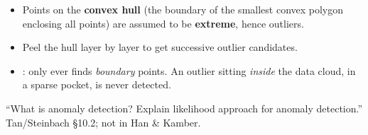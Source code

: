 {\begin{itemize}
  \begin{itemize}
    \item Points on the \textbf{convex hull} (the boundary of the smallest convex polygon
          enclosing all points) are assumed to be \textbf{extreme}, hence outliers.
    \item Peel the hull layer by layer to get successive outlier candidates.
    \item {}: only ever finds \emph{boundary} points. An outlier sitting \emph{inside}
          the data cloud, in a sparse pocket, is never detected.
  \end{itemize}
\end{itemize}}

\vspace{3pt}
{\color{sub}\footnotesize {} \gap ``What is anomaly detection? Explain likelihood approach
for anomaly detection.'' \gap Tan/Steinbach \S10.2; not in Han \& Kamber. \added}

